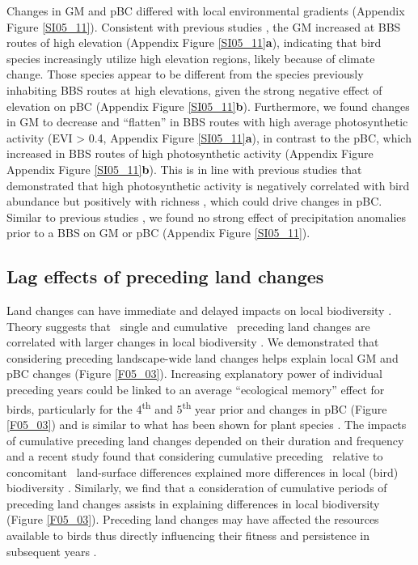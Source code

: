 Changes in GM and pBC differed with local environmental gradients (Appendix Figure \ref{SI05_11}). Consistent with previous studies \citep{Lomolino2008,Jarzyna2017}, the GM increased at BBS routes of high elevation (Appendix Figure \ref{SI05_11}\textbf{a}), indicating that bird species increasingly utilize high elevation regions, likely because of climate change. Those species appear to be different from the species previously inhabiting BBS routes at high elevations, given the strong negative effect of elevation on pBC (Appendix Figure \ref{SI05_11}\textbf{b}). Furthermore, we found changes in GM to decrease and “flatten” in BBS routes with high average photosynthetic activity (EVI > 0.4, Appendix Figure \ref{SI05_11}\textbf{a}), in contrast to the pBC, which increased in BBS routes of high photosynthetic activity (Appendix Figure Appendix Figure \ref{SI05_11}\textbf{b}). This is in line with previous studies that demonstrated that high photosynthetic activity is negatively correlated with bird abundance \citep{Barnagaud2017} but positively with richness \citep{Rowhani2008,Goetz2014}, which could drive changes in pBC. Similar to previous studies \citep{Barnagaud2017}, we found no strong effect of precipitation anomalies prior to a BBS on GM or pBC (Appendix Figure \ref{SI05_11}). 

\subsection{Lag effects of preceding land changes}
\label{C05_0402}

Land changes can have immediate and delayed impacts on local biodiversity \citep{Kuussaari2009,Hylander2013}. Theory suggests that \textendash\ single and cumulative \textendash\ preceding land changes are correlated with larger changes in local biodiversity \citep{Scheffer2001,Andersen2009,Watson2014,Ratajczak2018}. We demonstrated that considering preceding landscape-wide land changes helps explain local GM and pBC changes (Figure \ref{F05_03}). Increasing explanatory power of individual preceding years could be linked to an average “ecological memory” effect for birds, particularly for the 4\textsuperscript{th} and 5\textsuperscript{th} year prior and changes in pBC (Figure \ref{F05_03}) and is similar to what has been shown for plant species \citep{Ogle2015}. The impacts of cumulative preceding land changes depended on their duration \citep{Essl2015} and frequency \citep{Watson2014,Ratajczak2018} and a recent study found that considering cumulative preceding \textendash\ relative to concomitant \textendash\ land-surface differences explained more differences in local (bird) biodiversity \citep{Jung2018}. Similarly, we find that a consideration of cumulative periods of preceding land changes assists in explaining differences in local biodiversity (Figure \ref{F05_03}). Preceding land changes may have affected the resources available to birds thus directly influencing their fitness and persistence in subsequent years \citep{Holt2009,Harrison2011,Ogle2015}.

